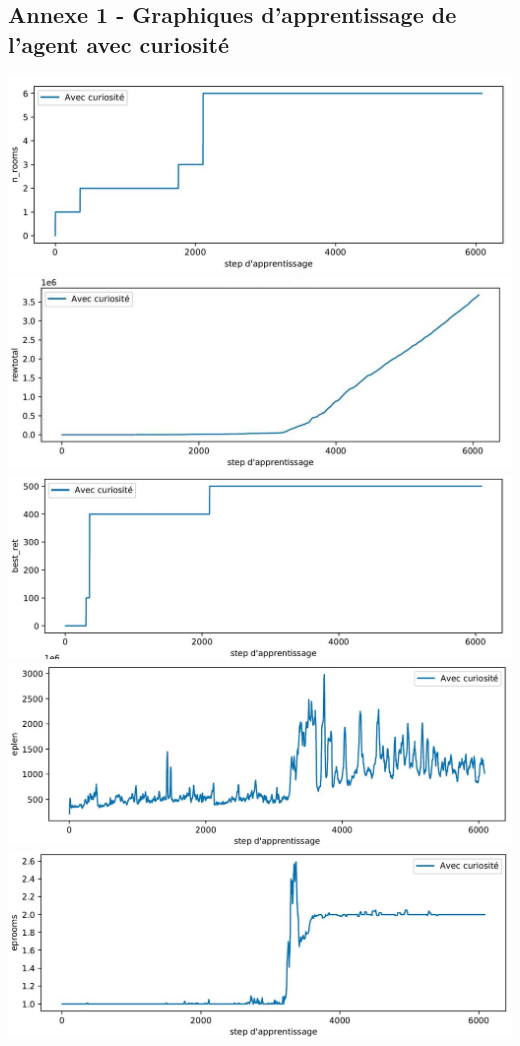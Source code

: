 \documentclass[a4paper,12pt]{report}
\begin{document}
\subsection*{Annexe 1 - Graphiques d'apprentissage de l'agent avec curiosité}
\label{annexe_1}
    \centering
    \includegraphics[width=\textwidth]{curiosity_only/curiosity_n_rooms.JPG}
    \includegraphics[width=\textwidth]{curiosity_only/curiosity_rewtotal.JPG}
    \includegraphics[width=\textwidth]{curiosity_only/curiosity_best_ret.JPG}
    \includegraphics[width=\textwidth]{curiosity_only/curiosity_eplen.JPG}
    \includegraphics[width=\textwidth]{curiosity_only/curiosity_eprooms.JPG}
\end{document}
